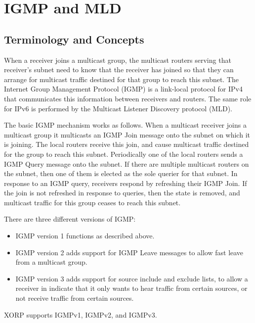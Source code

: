 %
%

\chapter{IGMP and MLD}
\label{igmp}

\section{Terminology and Concepts}

When a receiver joins a multicast group, the multicast routers serving
that receiver's subnet need to know that the receiver has joined so
that they can arrange for multicast traffic destined for that group to
reach this subnet.  The Internet Group Management Protocol (IGMP) is
a link-local protocol for IPv4 that communicates this information
between receivers and routers.  The same role for IPv6 is performed by
the Multicast Listener Discovery protocol (MLD).

The basic IGMP mechanism works as follows.  When a multicast receiver
joins a multicast group it multicasts an IGMP Join message onto the
subnet on which it is joining.  The local routers receive this join,
and cause multicast traffic destined for the group to reach this
subnet.  Periodically one of the local routers sends a IGMP Query
message onto the subnet.  If there are multiple multicast routers on
the subnet, then one of them is elected as the sole querier for that
subnet.  In response to an IGMP query, receivers respond by refreshing
their IGMP Join.  If the join is not refreshed in response to queries,
then the state is removed, and multicast traffic for this group ceases
to reach this subnet.

There are three different versions of IGMP:
\begin{itemize}
\item IGMP version 1 functions as described above.
\item IGMP version 2 adds support for IGMP Leave messages to allow
  fast leave from a multicast group.
\item IGMP version 3 adds support for source include and exclude
  lists, to allow a receiver in indicate that it only wants to hear
  traffic from certain sources, or not receive traffic from certain
  sources.
\end{itemize}

XORP supports IGMPv1, IGMPv2, and IGMPv3.

